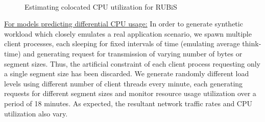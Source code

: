 \begin{figure}[t]
	\hspace{-0.6in}
	\centering
	\\
\caption{Estimating colocated CPU utilization for RUBiS} %
\label{fig:2ndchap-rubis-forward}
\end{figure}

\underline{For models predicting differential CPU usage:}
In order to generate
synthetic workload which closely emulates a real application
scenario, we spawn multiple client processes, each sleeping
for fixed intervals of time (emulating average think-time)
and generating request for transmission of varying number
of bytes or segment sizes. Thus, the artificial constraint
of each client process requesting only a single segment size
has been discarded. We generate randomly different load levels
using different number of client threads every minute, each
generating requests for different segment sizes
and monitor resource usage utilization
over a period of 18 minutes. As expected,
the resultant network traffic rates and
CPU utilization also vary.

